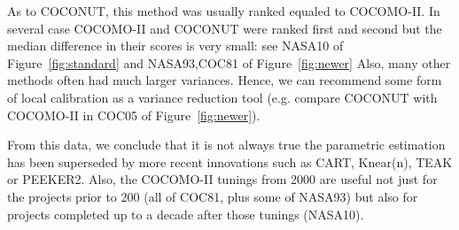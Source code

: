 \documentclass{sig-alternate}
\newcommand{\fig}[1]{Figure~\ref{fig:#1}}
\begin{document}
As to COCONUT, this method
was usually ranked equaled to COCOMO-II.  
In several case  COCOMO-II and COCONUT were ranked first and second but
the median difference in their scores is very small: see
NASA10 of \fig{standard} and NASA93,COC81 of \fig{newer}
Also,
many other methods often had much larger variances. 
Hence,  we can recommend some form of local calibration as a variance reduction tool
(e.g. compare COCONUT with COCOMO-II in COC05 of \fig{newer}).


From this data, we conclude that it is not
always true the parametric estimation has been
superseded by more recent innovations such
as CART, Knear(n), TEAK or PEEKER2. Also, the COCOMO-II tunings from 2000
are useful not just for the projects prior to 200
(all of COC81, plus some of NASA93)
but also for projects completed up to a decade after
those tunings (NASA10).
\end{document}
